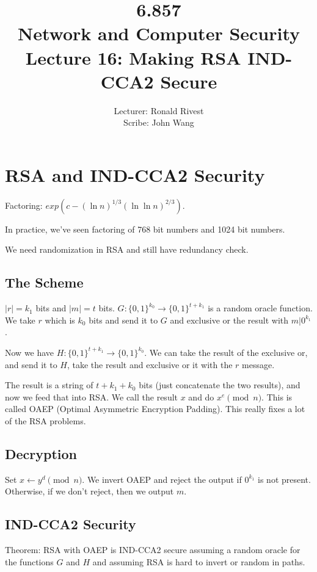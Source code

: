 \documentclass[psamsfonts]{amsart}
\title{6.857 \\
Network and Computer Security \\
Lecture 16: Making RSA IND-CCA2 Secure}
\author{Lecturer: Ronald Rivest\\
Scribe: John Wang}
\begin{document}
\maketitle

\section{RSA and IND-CCA2 Security}

Factoring: $exp( c - (\ln n)^{1/3} (\ln \ln n)^{2/3} )$.

In practice, we've seen factoring of 768 bit numbers and 1024 bit numbers.

We need randomization in RSA and still have redundancy check.

\subsection{The Scheme}

$|r| = k_1$ bits and $|m| = t$ bits. $G: \{0, 1\}^{k_0} \to \{0,1\}^{t + k_1}$ is a random oracle function. We take $r$ which is $k_0$ bits and send it to $G$ and exclusive or the result with $m | 0^{k_1}$.

Now we have $H: \{0,1\}^{t + k_1} \to \{0,1\}^{k_0}$. We can take the result of the exclusive or, and send it to $H$, take the result and exclusive or it with the $r$ message.

The result is a string of $t + k_1 + k_0$ bits (just concatenate the two results), and now we feed that into RSA. We call the result $x$ and do $x^e \pmod{n}$. This is called OAEP (Optimal Asymmetric Encryption Padding). This really fixes a lot of the RSA problems.

\subsection{Decryption}

Set $x \leftarrow y^d \pmod{n}$. We invert OAEP and reject the output if $0^{k_1}$ is not present. Otherwise, if we don't reject, then we output $m$. 

\subsection{IND-CCA2 Security}

Theorem: RSA with OAEP is IND-CCA2 secure assuming a random oracle for the functions $G$ and $H$ and assuming RSA is hard to invert or random in paths.
\end{document}
